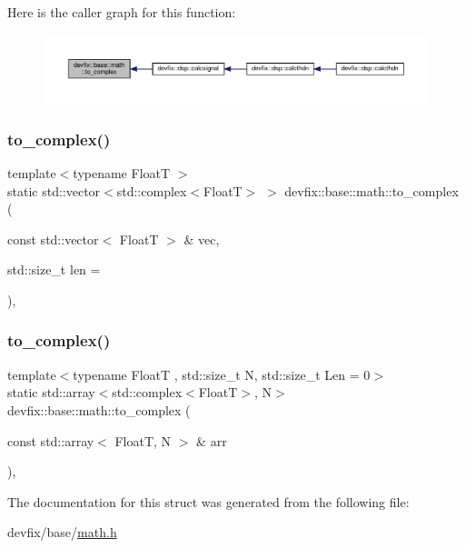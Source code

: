 Here is the caller graph for this function\+:
\nopagebreak
\begin{figure}[H]
\begin{center}
\leavevmode
\includegraphics[width=350pt]{structdevfix_1_1base_1_1math_a212f0b2e675de08688438e5bafb450c7_icgraph}
\end{center}
\end{figure}
\mbox{\label{structdevfix_1_1base_1_1math_ace2cb831db8aeccad7108bc411612544}} 
\subsubsection{\texorpdfstring{to\+\_\+complex()}{to\_complex()}\hspace{0.1cm}{\footnotesize\ttfamily [2/3]}}
{\footnotesize\ttfamily template$<$typename FloatT $>$ \\
static std\+::vector$<$std\+::complex$<$FloatT$>$ $>$ devfix\+::base\+::math\+::to\+\_\+complex (\begin{DoxyParamCaption}\item[{const std\+::vector$<$ FloatT $>$ \&}]{vec,  }\item[{std\+::size\+\_\+t}]{len = {} }\end{DoxyParamCaption})\hspace{0.3cm}{\ttfamily [inline]}, {\ttfamily [static]}}

\mbox{\label{structdevfix_1_1base_1_1math_aa125625a1d4063dc4bd4de82f7367f14}} 
\subsubsection{\texorpdfstring{to\+\_\+complex()}{to\_complex()}\hspace{0.1cm}{\footnotesize\ttfamily [3/3]}}
{\footnotesize\ttfamily template$<$typename FloatT , std\+::size\+\_\+t N, std\+::size\+\_\+t Len = 0$>$ \\
static std\+::array$<$std\+::complex$<$FloatT$>$, N$>$ devfix\+::base\+::math\+::to\+\_\+complex (\begin{DoxyParamCaption}\item[{const std\+::array$<$ FloatT, N $>$ \&}]{arr }\end{DoxyParamCaption})\hspace{0.3cm}{\ttfamily [inline]}, {\ttfamily [static]}}



The documentation for this struct was generated from the following file\+:\begin{DoxyCompactItemize}
\item 
devfix/base/\hyperlink{math_8h}{math.\+h}\end{DoxyCompactItemize}
